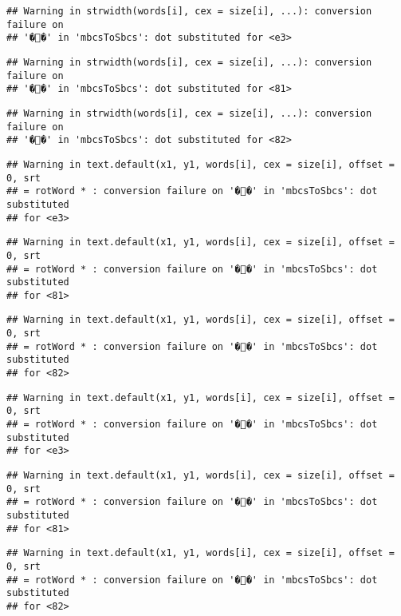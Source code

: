 \documentclass[]{article}
\begin{document}
\begin{verbatim}
## Warning in strwidth(words[i], cex = size[i], ...): conversion failure on
## '��' in 'mbcsToSbcs': dot substituted for <e3>
\end{verbatim}

\begin{verbatim}
## Warning in strwidth(words[i], cex = size[i], ...): conversion failure on
## '��' in 'mbcsToSbcs': dot substituted for <81>
\end{verbatim}

\begin{verbatim}
## Warning in strwidth(words[i], cex = size[i], ...): conversion failure on
## '��' in 'mbcsToSbcs': dot substituted for <82>
\end{verbatim}

\begin{verbatim}
## Warning in text.default(x1, y1, words[i], cex = size[i], offset = 0, srt
## = rotWord * : conversion failure on '��' in 'mbcsToSbcs': dot substituted
## for <e3>
\end{verbatim}

\begin{verbatim}
## Warning in text.default(x1, y1, words[i], cex = size[i], offset = 0, srt
## = rotWord * : conversion failure on '��' in 'mbcsToSbcs': dot substituted
## for <81>
\end{verbatim}

\begin{verbatim}
## Warning in text.default(x1, y1, words[i], cex = size[i], offset = 0, srt
## = rotWord * : conversion failure on '��' in 'mbcsToSbcs': dot substituted
## for <82>
\end{verbatim}

\begin{verbatim}
## Warning in text.default(x1, y1, words[i], cex = size[i], offset = 0, srt
## = rotWord * : conversion failure on '��' in 'mbcsToSbcs': dot substituted
## for <e3>
\end{verbatim}

\begin{verbatim}
## Warning in text.default(x1, y1, words[i], cex = size[i], offset = 0, srt
## = rotWord * : conversion failure on '��' in 'mbcsToSbcs': dot substituted
## for <81>
\end{verbatim}

\begin{verbatim}
## Warning in text.default(x1, y1, words[i], cex = size[i], offset = 0, srt
## = rotWord * : conversion failure on '��' in 'mbcsToSbcs': dot substituted
## for <82>
\end{verbatim}
\end{document}
